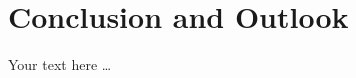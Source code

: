 \chapter{Conclusion and Outlook}\label{chap:conclusion}
\chapterstart

Your text here \ldots

\chapterend
